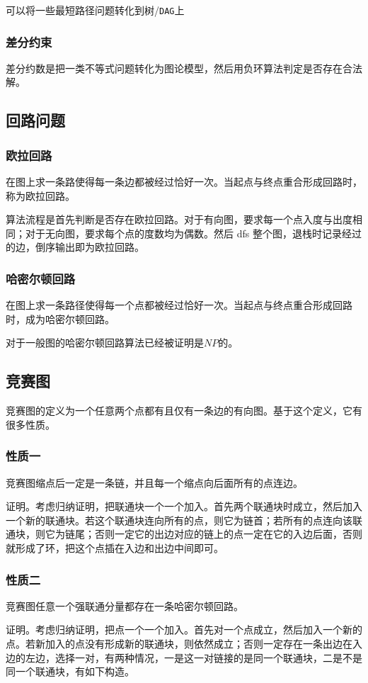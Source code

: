 \documentclass[UTF-8]{ctexart}
\begin{document}
	可以将一些最短路径问题转化到树/\texttt{DAG}上
	\subsubsection{差分约束}
	差分约数是把一类不等式问题转化为图论模型，然后用负环算法判定是否存在合法解。
	\subsection{回路问题}
	\subsubsection{欧拉回路}
	在图上求一条路使得每一条边都被经过恰好一次。当起点与终点重合形成回路时，称为欧拉回路。
	
	算法流程是首先判断是否存在欧拉回路。对于有向图，要求每一个点入度与出度相同；对于无向图，要求每个点的度数均为偶数。然后 dfs 整个图，退栈时记录经过的边，倒序输出即为欧拉回路。
	\subsubsection{哈密尔顿回路}
	在图上求一条路径使得每一个点都被经过恰好一次。当起点与终点重合形成回路时，成为哈密尔顿回路。
	
	对于一般图的哈密尔顿回路算法已经被证明是$NP$的。
	\subsection{竞赛图}
	竞赛图的定义为一个任意两个点都有且仅有一条边的有向图。基于这个定义，它有很多性质。
	
	\subsubsection{性质一}
	竞赛图缩点后一定是一条链，并且每一个缩点向后面所有的点连边。
	
	证明。考虑归纳证明，把联通块一个一个加入。首先两个联通块时成立，然后加入一个新的联通块。若这个联通块连向所有的点，则它为链首；若所有的点连向该联通块，则它为链尾；否则一定它的出边对应的链上的点一定在它的入边后面，否则就形成了环，把这个点插在入边和出边中间即可。
	
	\subsubsection{性质二}
	竞赛图任意一个强联通分量都存在一条哈密尔顿回路。
	
	证明。考虑归纳证明，把点一个一个加入。首先对一个点成立，然后加入一个新的点。若新加入的点没有形成新的联通块，则依然成立；否则一定存在一条出边在入边的左边，选择一对，有两种情况，一是这一对链接的是同一个联通块，二是不是同一个联通块，有如下构造。
	
\end{document}
